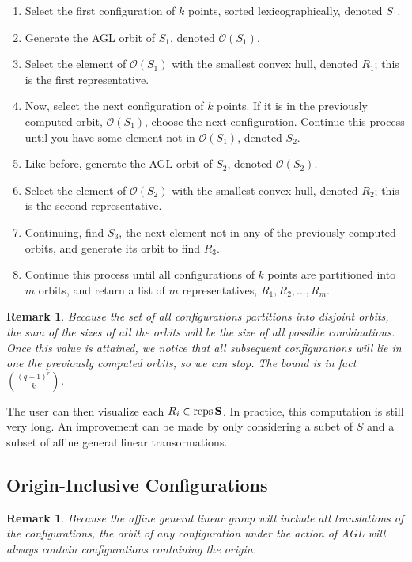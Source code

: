 \documentclass[12pt]{amsart}
\theoremstyle{plain}
\newtheorem{Remark}[Th]{Remark}
\DeclareMathOperator{\Reps}{reps}
\begin{document}
\begin{enumerate}
\item{} Select the first configuration of $k$ points, sorted lexicographically, denoted $S_1$.
\item{} Generate the AGL orbit of $S_1$, denoted $\mathscr{O}(S_1)$.
\item{} Select the element of $\mathscr{O}(S_1)$ with the smallest convex hull, denoted $R_1$; this is the first representative.
\item{} Now, select the next configuration of $k$ points. If it is in the previously computed orbit, $\mathscr{O}(S_1)$, choose the next configuration. Continue this process until you have some element not in $\mathscr{O}(S_1)$, denoted $S_2$.
\item{} Like before, generate the AGL orbit of $S_2$, denoted $\mathscr{O}(S_2)$.
\item{} Select the element of $\mathscr{O}(S_2)$ with the smallest convex hull, denoted $R_2$; this is the second representative.
\item{} Continuing, find $S_3$, the next element not in any of the previously computed orbits, and generate its orbit to find $R_3$.
\item{} Continue this process until all configurations of $k$ points are partitioned into $m$ orbits, and return a list of $m$ representatives, $R_1, R_2, ..., R_m$.
\end{enumerate}
\begin{Remark}
Because the set of all configurations partitions into disjoint orbits, the sum of the sizes of all the orbits will be the size of all possible combinations. Once this value is attained, we notice that all subsequent configurations will lie in one the previously computed orbits, so we can stop. The bound is in fact ${(q-1)^r \choose k}$.
\end{Remark}


The user can then visualize each $R_i \in \Reps{\bold{S}}$. In practice, this computation is still very long. An improvement can be made by only considering a subet of $S$ and a subset of affine general linear transormations.
\subsection{Origin-Inclusive Configurations}
\begin{Remark}
Because the affine general linear group will include all translations of the configurations, the orbit of any configuration under the action of AGL will always contain configurations containing the origin.
\end{Remark}
\end{document}
